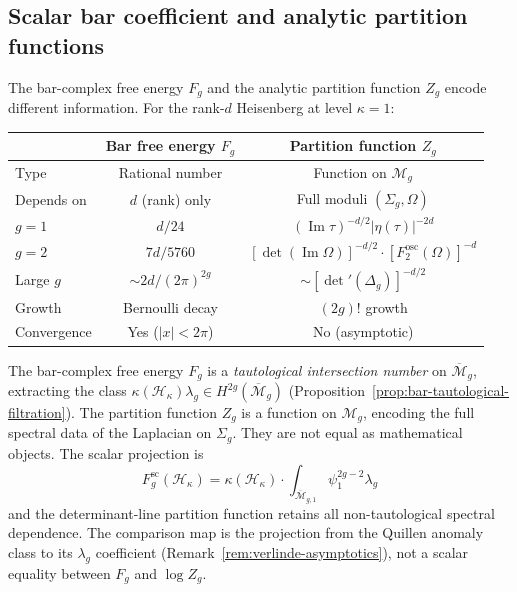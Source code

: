 \subsection{Scalar bar coefficient and analytic partition functions}

\begin{remark}
\label{rem:bar-vs-partition-systematic}

The bar-complex free energy $F_g$ and the analytic partition
function $Z_g$ encode different information.
For the rank-$d$ Heisenberg at level $\kappa = 1$:

\begin{center}
\renewcommand{\arraystretch}{1.3}
\begin{tabular}{l|cc}
& Bar free energy $F_g$ & Partition function $Z_g$ \\
\hline
Type & Rational number & Function on $\mathcal{M}_g$ \\
Depends on & $d$ (rank) only & Full moduli $(\Sigma_g, \Omega)$ \\
$g = 1$ & $d/24$ & $(\operatorname{Im}\tau)^{-d/2}
|\eta(\tau)|^{-2d}$ \\
$g = 2$ & $7d/5760$ &
$[\det(\operatorname{Im}\Omega)]^{-d/2}
\cdot [F_2^{\mathrm{osc}}(\Omega)]^{-d}$ \\
Large $g$ & $\sim 2d/(2\pi)^{2g}$ &
$\sim [\det'(\Delta_g)]^{-d/2}$ \\
Growth & Bernoulli decay & $(2g)!$ growth \\
Convergence & Yes ($|x| < 2\pi$) & No (asymptotic)
\end{tabular}
\end{center}

The bar-complex free energy $F_g$ is a \emph{tautological intersection
number} on $\overline{\mathcal{M}}_g$, extracting the class
$\kappa(\mathcal H_\kappa)\lambda_g
\in H^{2g}(\overline{\mathcal{M}}_g)$
(Proposition~\ref{prop:bar-tautological-filtration}).
The partition function $Z_g$ is a function on $\mathcal{M}_g$,
encoding the full spectral data of the Laplacian on $\Sigma_g$.
They are not equal as mathematical objects. The scalar projection is
\[
F_g^{\mathrm{sc}}(\mathcal H_\kappa)
 = \kappa(\mathcal H_\kappa)
   \cdot \int_{\overline{\mathcal{M}}_{g,1}}\psi_1^{2g-2} \lambda_g
\]
and the determinant-line partition function retains all non-tautological
spectral dependence. The comparison map is the projection from the
Quillen anomaly class to its $\lambda_g$ coefficient
(Remark~\ref{rem:verlinde-asymptotics}), not a scalar equality
between $F_g$ and $\log Z_g$.
\end{remark}


